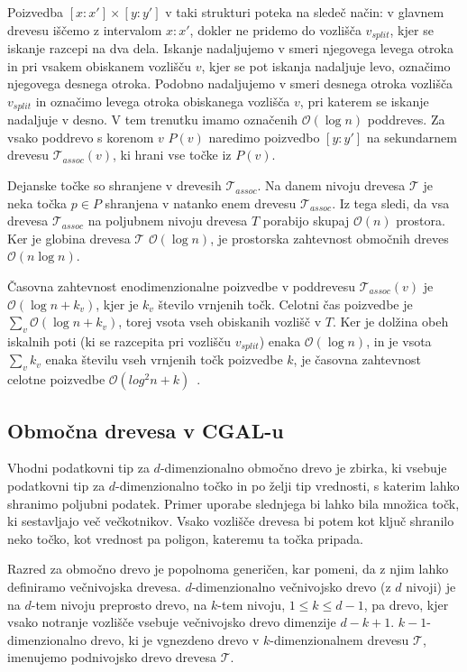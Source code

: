 \documentclass[a4paper, 12pt]{book}
\newcommand{\T}{\ensuremath{\mathcal{T}}}
\newcommand{\OO}{\ensuremath{\mathcal{O}}} %
\begin{document}
Poizvedba $[x:x'] \times [y:y']$ v taki strukturi poteka na sledeč način: v glavnem drevesu iščemo z intervalom $x:x'$, dokler ne pridemo do vozlišča $v_{split}$, kjer se iskanje razcepi na dva dela. Iskanje nadaljujemo v smeri njegovega levega otroka in pri vsakem obiskanem vozlišču $v$, kjer se pot iskanja nadaljuje levo, označimo njegovega desnega otroka. Podobno nadaljujemo v smeri desnega otroka vozlišča $v_{split}$ in označimo levega otroka obiskanega vozlišča $v$, pri katerem se iskanje nadaljuje v desno. 
V tem trenutku imamo označenih $\OO(\log n)$ poddreves. Za vsako poddrevo s korenom $v$ $P(v)$ naredimo poizvedbo $[y:y']$ na sekundarnem drevesu $\T_{assoc}(v)$, ki hrani vse točke iz $P(v)$. 

Dejanske točke so shranjene v drevesih $\T_{assoc}$. Na danem nivoju drevesa $\T$ je neka točka $p \in P$ shranjena v natanko enem drevesu $\T_{assoc}$. Iz tega sledi, da vsa drevesa $\T_{assoc}$ na poljubnem nivoju drevesa $T$ porabijo skupaj $\OO(n)$ prostora. Ker je globina drevesa $\T$ $\OO(\log n)$, je prostorska zahtevnost območnih dreves $\OO(n\log n)$.

Časovna zahtevnost enodimenzionalne poizvedbe v poddrevesu $\T_{assoc}(v)$ je $\OO(\log n + k_v)$, kjer je $k_v$ število vrnjenih točk. Celotni čas poizvedbe je $\sum_v\OO(\log n + k_v)$, torej vsota vseh obiskanih vozlišč v $T$. Ker je dolžina obeh iskalnih poti (ki se razcepita pri vozlišču $v_{split}$) enaka $\OO(\log n)$, in je vsota $\sum_v k_v$ enaka številu vseh vrnjenih točk poizvedbe $k$, je časovna zahtevnost celotne poizvedbe $\OO(log^2n + k)$~\cite{bkos-08-range}.

\subsection{Območna drevesa v CGAL-u}
Vhodni podatkovni tip za $d$-dimenzionalno območno drevo je zbirka, ki vsebuje podatkovni tip za $d$-dimenzionalno točko in po želji tip vrednosti, s katerim lahko shranimo poljubni podatek. Primer uporabe slednjega bi lahko bila množica točk, ki sestavljajo več večkotnikov. Vsako vozlišče drevesa bi potem kot ključ shranilo neko točko, kot vrednost pa poligon, kateremu ta točka pripada. 

Razred za območno drevo je popolnoma generičen, kar pomeni, da z njim lahko definiramo večnivojska drevesa. $d$-dimenzionalno večnivojsko drevo  (z $d$ nivoji) je na $d$-tem nivoju preprosto drevo, na $k$-tem nivoju, $1 \leq k \leq d-1$, pa drevo, kjer vsako notranje vozlišče vsebuje večnivojsko drevo dimenzije $d-k+1$. $k-1$-dimenzionalno drevo, ki je vgnezdeno drevo v $k$-dimenzionalnem drevesu \T, imenujemo podnivojsko drevo drevesa \T. 
\end{document}
